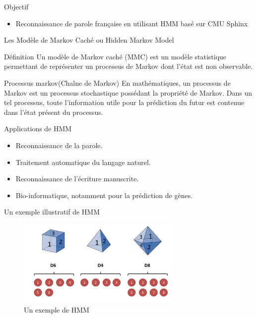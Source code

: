\begin{frame}{Objectif}

\begin{itemize}
\item Reconnaissance de parole française en utilisant HMM basé sur CMU Sphinx
\end{itemize}

\end{frame}

\begin{frame}{Les Modèle de Markov Caché ou Hidden Markov Model}

\begin{block}{Définition}
Un modèle de Markov caché (MMC) est un modèle
statistique permettant de représenter un processus
de Markov dont l’état est non observable. 
	\end{block}
	\begin{block}{Processus markov(Chaîne de Markov)}
	En mathématiques, un processus de Markov est un processus stochastique possédant la propriété de Markov. Dans un tel processus, toute l'information utile pour la prédiction du futur est contenue dans l'état présent du processus.
	\end{block}
\end{frame}

\begin{frame}{Applications de HMM}
\begin{itemize}
\item Reconnaissance de la parole.
\item Traitement automatique du langage naturel.
\item Reconnaissance de l'écriture manuscrite.
\item Bio-informatique, notamment pour la prédiction de gènes.
\end{itemize}
\end{frame}

\begin{frame}{Un exemple illustratif de HMM}
\begin{figure}
\centering
\includegraphics[width=8cm]{images/hmm.png}
\caption{Un exemple de HMM}
\end{figure}
\end{frame}



